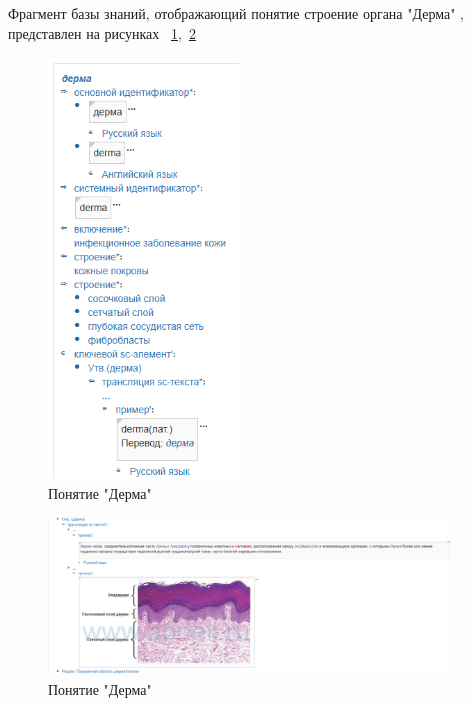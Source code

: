 Фрагмент базы знаний, отображающий  понятие строение органа "Дерма" \cite{bme}$,$ представлен на рисунках
~\ref{fig:sections/derma},~\ref{fig:sections/derma2}
\begin{figure}[H]
	\centering
	\includegraphics[width=0.45\textwidth]{sections/derma.png}
	\caption{Понятие "Дерма"}
	\label{fig:sections/derma}
\end{figure}
\begin{figure}[H]
	\centering
	\includegraphics[width=0.95\textwidth]{sections/derma2.png}
	\caption{Понятие "Дерма"}
	\label{fig:sections/derma2}
\end{figure}

